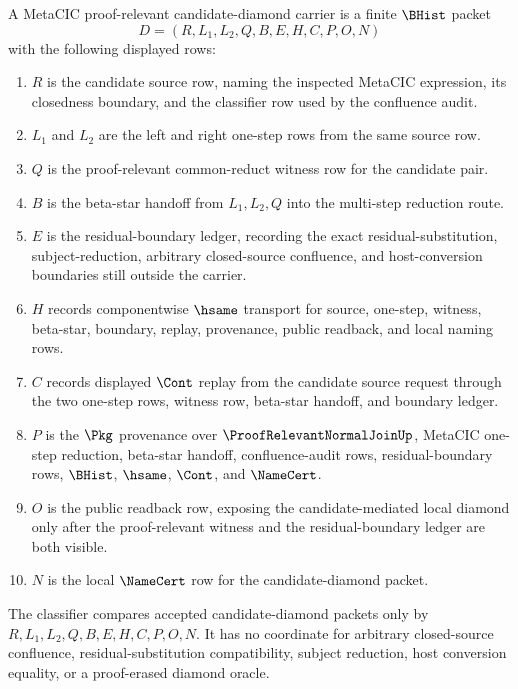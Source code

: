 \begin{definition}\label{def:metacic-proof-relevant-candidate-diamond-carrier}
A MetaCIC proof-relevant candidate-diamond carrier is a finite $\BHist$ packet
$$
D=(R,L_1,L_2,Q,B,E,H,C,P,O,N)
$$
with the following displayed rows:
\begin{enumerate}
\item $R$ is the candidate source row, naming the inspected MetaCIC expression, its closedness boundary, and the classifier row used by the confluence audit.
\item $L_1$ and $L_2$ are the left and right one-step rows from the same source row.
\item $Q$ is the proof-relevant common-reduct witness row for the candidate pair.
\item $B$ is the beta-star handoff from $L_1,L_2,Q$ into the multi-step reduction route.
\item $E$ is the residual-boundary ledger, recording the exact residual-substitution, subject-reduction, arbitrary closed-source confluence, and host-conversion boundaries still outside the carrier.
\item $H$ records componentwise $\hsame$ transport for source, one-step, witness, beta-star, boundary, replay, provenance, public readback, and local naming rows.
\item $C$ records displayed $\Cont$ replay from the candidate source request through the two one-step rows, witness row, beta-star handoff, and boundary ledger.
\item $P$ is the $\Pkg$ provenance over $\ProofRelevantNormalJoinUp$, MetaCIC one-step reduction, beta-star handoff, confluence-audit rows, residual-boundary rows, $\BHist$, $\hsame$, $\Cont$, and $\NameCert$.
\item $O$ is the public readback row, exposing the candidate-mediated local diamond only after the proof-relevant witness and the residual-boundary ledger are both visible.
\item $N$ is the local $\NameCert$ row for the candidate-diamond packet.
\end{enumerate}
The classifier compares accepted candidate-diamond packets only by $R,L_1,L_2,Q,B,E,H,C,P,O,N$. It has no coordinate for arbitrary closed-source confluence, residual-substitution compatibility, subject reduction, host conversion equality, or a proof-erased diamond oracle.
\end{definition}

